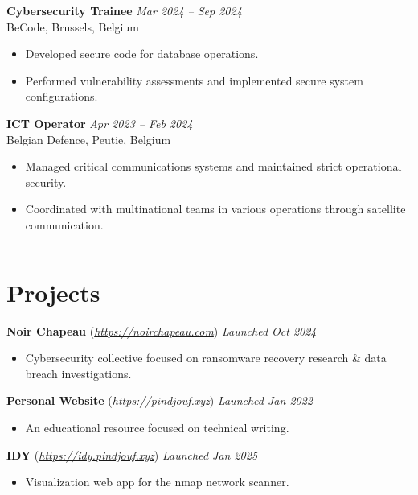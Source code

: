 \documentclass[a4paper,10pt]{article}
\begin{document}
\noindent\textbf{Cybersecurity Trainee} \hfill \textit{Mar 2024 – Sep 2024} \\
BeCode, Brussels, Belgium
\begin{itemize}
    \item Developed secure code for database operations.
    \item Performed vulnerability assessments and implemented secure system configurations.
\end{itemize}
\vspace{8pt}

\noindent\textbf{ICT Operator} \hfill \textit{Apr 2023 – Feb 2024} \\
Belgian Defence, Peutie, Belgium
\begin{itemize}
    \item Managed critical communications systems and maintained strict operational security.
    \item Coordinated with multinational teams in various operations through satellite communication.
\end{itemize}

\vspace{5pt}
\hrule

\section*{Projects}
\vspace{-4pt}
\textbf{Noir Chapeau} (\textit{\href{https://noirchapeau.com}{https://noirchapeau.com}}) \hfill \textit{Launched Oct 2024}
\begin{itemize}
    \item Cybersecurity collective focused on ransomware recovery research \& data breach investigations.
\end{itemize}

\noindent\textbf{Personal Website} (\textit{\href{https://pindjouf.xyz}{https://pindjouf.xyz}}) \hfill \textit{Launched Jan 2022}
\begin{itemize}
    \item An educational resource focused on technical writing.
\end{itemize}

\vspace{5pt}

\noindent\textbf{IDY} (\textit{\href{https://idy.pindjouf.xyz}{https://idy.pindjouf.xyz}}) \hfill \textit{Launched Jan 2025}
\begin{itemize}
    \item Visualization web app for the nmap network scanner.
\end{itemize}
\end{document}
